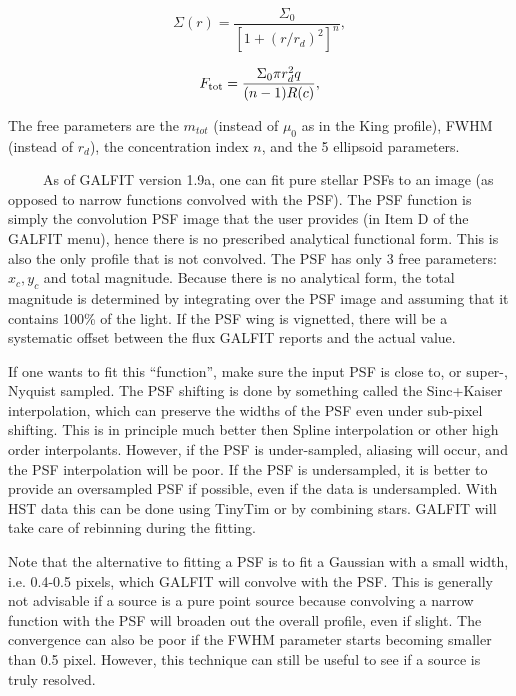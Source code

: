 \documentclass[preprint]{aastex}
\begin{document}
\begin{equation}
\Sigma(r) = {\frac{\Sigma_0} {\left[1+(r/r_d)^2\right]^n}},
\end{equation}

\begin {equation}
F_{\rm tot} = {\frac {\Sigma_0 \pi r_d^2 q} {(n-1) R(c)}},
\end {equation}

\noindent The free parameters are the $m_{tot}$ (instead of $\mu_0$ as in the
King profile), FWHM (instead of $r_d$), the concentration index $n$, and
the 5 ellipsoid parameters.

\bigskip

 \ \ \ \ \ As of GALFIT version 1.9a, one can
fit pure stellar PSFs to an image (as opposed to narrow functions convolved
with the PSF).  The PSF function is simply the convolution PSF image that the
user provides (in Item D of the GALFIT menu), hence there is no prescribed
analytical functional form.  This is also the only profile that is not
convolved.  The PSF has only 3 free parameters: $x_c, y_c$ and total
magnitude.  Because there is no analytical form, the total magnitude is
determined by integrating over the PSF image and assuming that it contains
100\% of the light.  If the PSF wing is vignetted, there will be a systematic
offset between the flux GALFIT reports and the actual value.

If one wants to fit this ``function'', make sure the input PSF is close to, or
super-, Nyquist sampled.  The PSF shifting is done by something called the
Sinc+Kaiser interpolation, which can preserve the widths of the PSF even under
sub-pixel shifting.  This is in principle much better then Spline
interpolation or other high order interpolants.  However, if the PSF is
under-sampled, aliasing will occur, and the PSF interpolation will be poor.
If the PSF is undersampled, it is better to provide an oversampled PSF if
possible, even if the data is undersampled.  With HST data this can be done
using TinyTim or by combining stars.  GALFIT will take care of rebinning
during the fitting.

Note that the alternative to fitting a PSF is to fit a Gaussian with a small
width, i.e. 0.4-0.5 pixels, which GALFIT will convolve with the PSF.  This is
generally not advisable if a source is a pure point source because convolving
a narrow function with the PSF will broaden out the overall profile, even if
slight.  The convergence can also be poor if the FWHM parameter starts
becoming smaller than 0.5 pixel.  However, this technique can still be useful
to see if a source is truly resolved.
\end{document}
